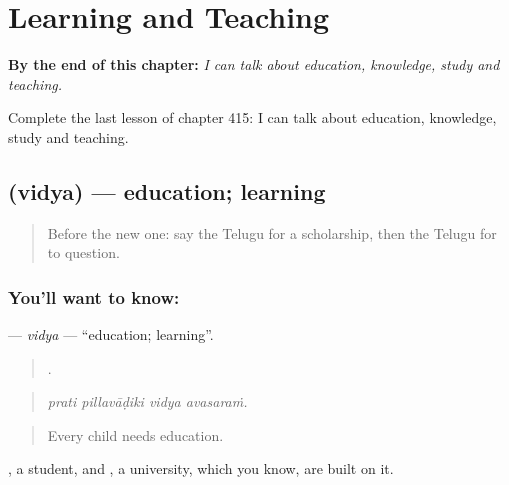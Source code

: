 
\chapter{Learning and Teaching}
\label{ch:te-learning-and-teaching}

\begin{chapteropening}
\textbf{By the end of this chapter:} \emph{I can talk about education, knowledge, study and teaching.}

Complete the last lesson of chapter 415: I can talk about education, knowledge, study and teaching.
\end{chapteropening}

\section[\texorpdfstring{\te{విద్య} (vidya)}{విద్య (vidya)}]{ (vidya) — education; learning}

\label{lesson:TE-C415-vidya}



\begin{quote}
Before the new one: say the Telugu for a scholarship, then the Telugu for to question.
\end{quote}

\subsection*{You'll want to know: }
\textbf{} — \emph{vidya} — \textquotedblleft{}education; learning\textquotedblright{}.

\begin{quote}
   .
\end{quote}

\begin{quote}
\emph{prati pillavāḍiki vidya avasaraṁ.}
\end{quote}

\begin{quote}
Every child needs education.
\end{quote}

, a student, and , a university, which you know, are built on it.

